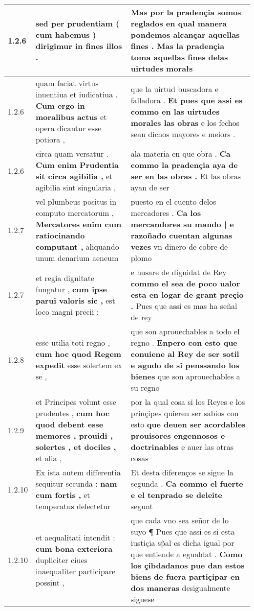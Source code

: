 \begin{tabular}{|p{1cm}|p{6.5cm}|p{6.5cm}|}
1.2.6 & sed per prudentiam \textbf{ ( cum habemus ) } dirigimur in fines illos . & Mas por la pradençia somos reglados \textbf{ en qual manera pondemos alcançar aquellas fines . } Mas la pradençia toma aquellas fines delas uirtudes morałs \\\hline
1.2.6 & quam faciat virtus inuentiua et iudicatiua . \textbf{ Cum ergo in moralibus actus } et opera dicantur esse potiora , & que la uirtud buscadora e falladora . \textbf{ Et pues que assi es commo en las uirtudes morales las obras } e los fechos sean dichos mayores e meiors . \\\hline
1.2.6 & circa quam versatur . \textbf{ Cum enim Prudentia sit circa agibilia , } et agibilia sint singularia , & ala materia en que obra . \textbf{ Ca commo la pradençia aya de ser en las obras . } Et las obras ayan de ser \\\hline
1.2.7 & vel plumbeus positus in computo mercatorum , \textbf{ Mercatores enim cum ratiocinando computant , } aliquando unum denarium aeneum & puesto en el cuento delos mercadores . \textbf{ Ca los mercandores su mando | e razoñado cuentan algunas vezes } vn dinero de cobre de plomo \\\hline
1.2.7 & et regia dignitate fungatur , \textbf{ cum ipse parui valoris sic , } est loco magni precii : & e husare de dignidat de Rey \textbf{ commo el sea de poco ualor esta en logar de grant preçio . } Pues que assi es mas ha señal de rey \\\hline
1.2.8 & esse utilia toti regno , \textbf{ cum hoc quod Regem expedit } esse solertem ex se , & que son aprouechables a todo el regno . \textbf{ Enpero con esto que conuiene al Rey de ser sotil e agudo de si penssando los bienes } que son aprouechables a su regno \\\hline
1.2.9 & et Principes volunt esse prudentes , \textbf{ cum hoc quod debent esse memores , prouidi , solertes , et dociles , } et alia , & por la qual cosa si los Reyes e los prinçipes quieren ser sabios con esto \textbf{ que deuen ser acordables prouisores engennosos e doctrinables } e auer las otras cosas \\\hline
1.2.10 & Ex ista autem differentia sequitur secunda : \textbf{ nam cum fortis , } et temperatus delectetur & Et desta diferenços se sigue la segunda . \textbf{ Ca commo el fuerte e el tenprado se deleite } segunt \\\hline
1.2.10 & et aequalitati intendit : \textbf{ cum bona exteriora } dupliciter ciues inaequaliter participare possint , & que cada vno sea señor de lo suyo ¶ Pues que assi es si esta iustiçia sp̃al es dicha igual por que entiende a egualdat . \textbf{ Como los çibdadanos pue dan estos biens de fuera partiçipar en dos maneras } desigualmente siguese \\\hline

\end{tabular}
